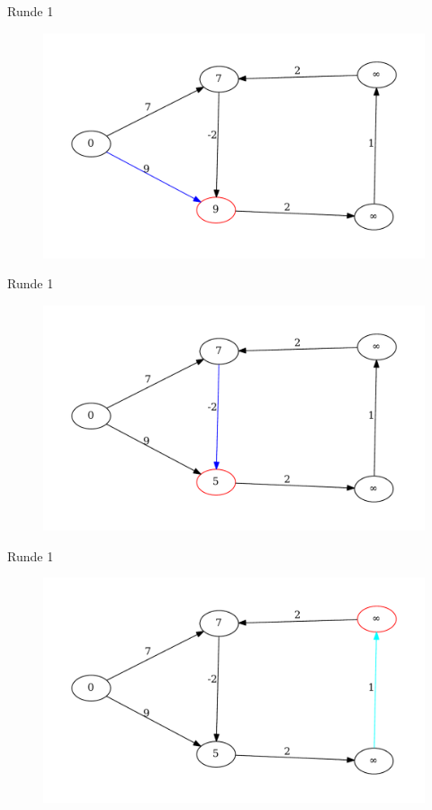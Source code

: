 \begin{frame}{Runde 1}
\begin{figure}[htbp]
\centering
\includegraphics[width=\linewidth]{bellman_ford_graphs/graph_02.pdf}
\end{figure}
\end{frame}

\begin{frame}{Runde 1}
\begin{figure}[htbp]
\centering
\includegraphics[width=\linewidth]{bellman_ford_graphs/graph_03.pdf}
\end{figure}
\end{frame}

\begin{frame}{Runde 1}
\begin{figure}[htbp]
\centering
\includegraphics[width=\linewidth]{bellman_ford_graphs/graph_04.pdf}
\end{figure}
\end{frame}

